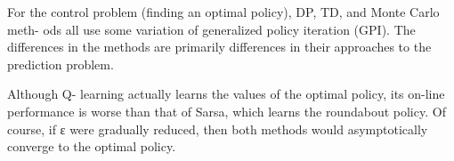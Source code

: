 \documentclass{article}
\begin{document}
\newpage

For the
control problem (finding an optimal policy), DP, TD, and Monte Carlo meth-
ods all use some variation of generalized policy iteration (GPI). The diﬀerences
in the methods are primarily diﬀerences in their approaches to the prediction
problem.


Although Q-
learning actually learns the values of the optimal policy, its on-line performance
is worse than that of Sarsa, which learns the roundabout policy. Of course, if
ε were gradually reduced, then both methods would asymptotically converge
to the optimal policy.



\newpage

\end{document}
